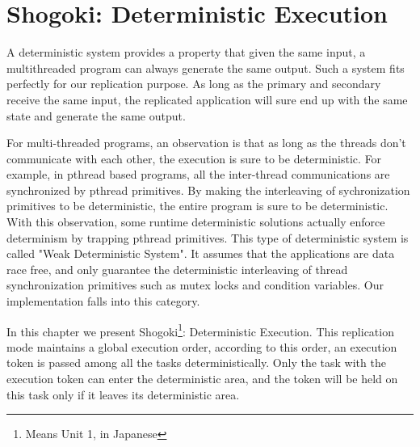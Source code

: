 \chapter{Shogoki: Deterministic Execution} \label{chap:detexec}
A deterministic system provides a property that given the same input, a multithreaded program can always generate the same output. Such a system fits perfectly for our replication purpose. As long as the primary and secondary receive the same input, the replicated application will sure end up with the same state and generate the same output.

For multi-threaded programs, an observation is that as long as the threads don't communicate with each other, the execution is sure to be deterministic\cite{devietti2009dmp}. For example, in pthread based programs, all the inter-thread communications are synchronized by pthread primitives. By making the interleaving of sychronization primitives to be deterministic, the entire program is sure to be deterministic. With this observation, some runtime deterministic solutions actually enforce determinism by trapping pthread primitives\cite{cui2013parrot}\cite{liu2011dthreads}\cite{olszewski2009kendo}. This type of deterministic system is called "Weak Deterministic System". It assumes that the applications are data race free, and only guarantee the deterministic interleaving of thread synchronization primitives such as mutex locks and condition variables. Our implementation falls into this category.

In this chapter we present Shogoki\footnote{Means Unit 1, in Japanese}: Deterministic Execution. This replication mode maintains a global execution order, according to this order, an execution token is passed among all the tasks deterministically. Only the task with the execution token can enter the deterministic area, and the token will be held on this task only if it leaves its deterministic area.


